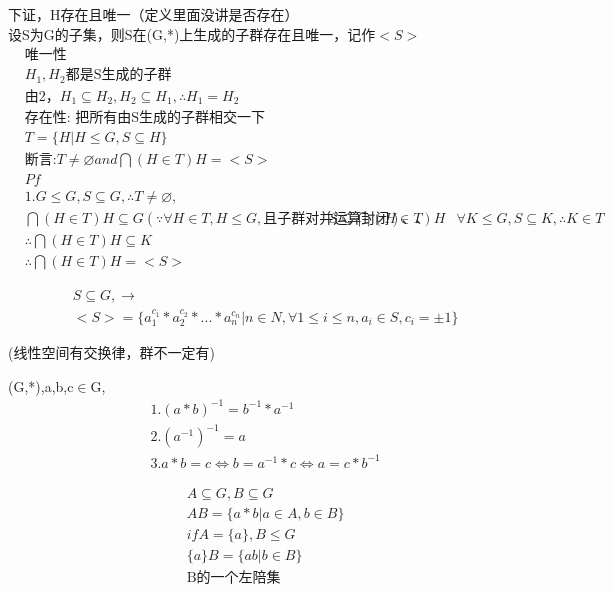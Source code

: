 \documentclass[12pt, a4paper]{article}  %
\begin{document}
下证，H存在且唯一（定义里面没讲是否存在）\\
设S为G的子集，则S在(G,*)上生成的子群存在且唯一，记作\(<S>\)\\
\begin{align}
    &\text{唯一性}\\
    &H_1,H_2\text{都是S生成的子群}\\
    &\text{由2，}H_1 \subseteq H_2,H_2\subseteq H_1,\therefore H_1=H_2\\
    &\text{存在性: 把所有由S生成的子群相交一下}\\
    & T=\{H|H \leqslant G,S\subseteq H\}\\
    &\text{断言:} T\neq \varnothing and \bigcap(H\in T) H =<S>\\
    &Pf\\
    &1.G\leqslant G,S\subseteq G,\therefore T\neq \varnothing,\\
    & \bigcap(H\in T) H \subseteq G(\because \forall H\in T,H\leqslant G, \text{且子群对并运算封闭})、、
    & S\subseteq \bigcap(H\in T) H
    &\forall K\leqslant G,S\subseteq K,\therefore K\in T\\
    &\therefore \bigcap(H\in T) H\subseteq K\\
    &\therefore \bigcap(H\in T) H=<S>
\end{align}

\begin{align}
    &S\subseteq G,\rightarrow\\
    &<S>=\{a_1^{c_1}*a_2^{c_2}*...*a_n^{c_n}|n\in N,\forall 1 \leqslant i \leqslant n,a_i\in S,c_i=\pm 1\}
\end{align}

(线性空间有交换律，群不一定有)

(G,*),a,b,c\(\in\)G,
\begin{align}
    &1.(a*b)^{-1}=b^{-1}*a^{-1}\\
    &2.(a^{-1})^{-1}=a\\
    &3.a*b=c \Leftrightarrow  b=a^{-1}*c \Leftrightarrow a=c*b^{-1}
\end{align}

\begin{align}
    &A\subseteq G,B \subseteq G\\
    &AB=\{a*b|a\in A,b\in B\}\\
    &if A=\{a\},B\leqslant G\\
    & \{a\}B=\{ab|b\in B\}\\
    &\text{B的一个左陪集}
\end{align}
\end{document}

